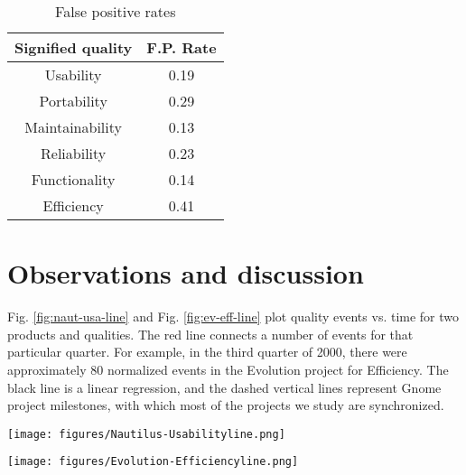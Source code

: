\documentclass[conference, compsoc]{IEEEtran}
\begin{document}
\begin{table}
	\caption{False positive rates}
	\centering
	\label{tbl:error}
\begin{tabular}{|c|c|}
\hline
Signified quality & F.P. Rate  \\
\hline
\hline
Usability & 0.19\\ \hline
Portability & 0.29\\ \hline
Maintainability & 0.13\\ \hline
Reliability & 0.23\\ \hline
Functionality & 0.14 \\ \hline
Efficiency & 0.41\\ \hline
\hline
\end{tabular}
\end{table}

\section{Observations and discussion}
\label{sec:observations}
Fig. \ref{fig:naut-usa-line} and Fig. \ref{fig:ev-eff-line} plot quality events vs. time for two products and qualities. The red line connects a number of events for that particular quarter. For example, in the third quarter of 2000, there were approximately 80 normalized events in the Evolution project for Efficiency. The black line is a linear regression, and the dashed vertical lines represent Gnome project milestones, with which most of the projects we study are synchronized.

\begin{figure*}[]
\begin{minipage}[]{0.5\textwidth}
\centering
\texttt{[image: figures/Nautilus-Usabilityline.png]} 
\label{fig:naut-usa-line}
\caption{Product: Nautilus, Quality: Usability}
\end{minipage}%
\hspace{0.2cm}
\begin{minipage}[]{0.5\textwidth}
\centering
\texttt{[image: figures/Evolution-Efficiencyline.png]}
\label{fig:ev-eff-line}
\caption{Product: Evolution, Quality: Efficiency}
\end{minipage}
\end{figure*}
\end{document}
